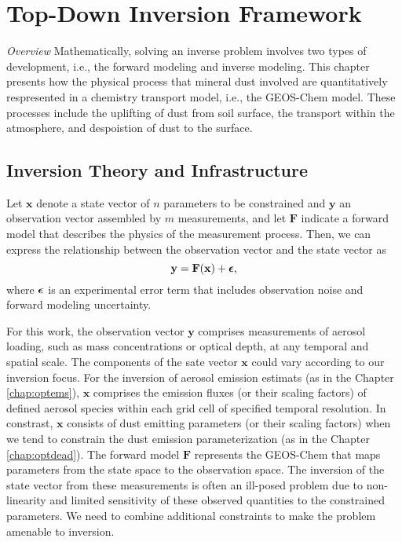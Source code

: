 \chapter{Top-Down Inversion Framework}

 \textit{Overview} \hspace{0.2cm}
 Mathematically, solving an inverse problem involves two types of development, 
 i.e., the forward modeling and inverse modeling. This chapter presents 
 how the physical process that mineral dust
 involved are quantitatively respresented in a chemistry transport model, i.e.,
 the GEOS-Chem model. These processes include the uplifting of dust from soil surface,
 the transport within the atmosphere, and despoistion of dust to the surface.

\section{Inversion Theory and Infrastructure}

Let $\mathbf{x}$ denote a state vector of $n$ parameters to be constrained
 and $\mathbf{y}$ an observation vector assembled by $m$ measurements,
 and let $\mathbf{F}$ indicate a forward model that describes the physics of
 the measurement process. Then, we can express the relationship between
 the observation vector and the state vector as
 \begin{equation} \label{eq:fx}
 \mathbf{y} = \mathbf{F}(\mathbf{x}) + \boldsymbol{\epsilon} \mbox{,}
 \end{equation}
 where $\boldsymbol{\epsilon}$ is an experimental error term that includes
 observation noise and forward modeling uncertainty.

 For this work, the observation
 vector $\mathbf{y}$ comprises measurements of
 aerosol loading, such as mass concentrations or optical depth, at any temporal
 and spatial scale. The components of the sate vector $\mathbf{x}$ could vary
 according to our inversion focus. For the inversion of aerosol emission estimats
 (as in the Chapter \ref{chap:optems}),
 $\mathbf{x}$ comprises the emission fluxes (or their scaling factors) of defined
 aerosol species within each grid cell of specified temporal resolution.
 In constrast, $\mathbf{x}$ consists of
 dust emitting parameters (or their scaling factors) when we tend to constrain
 the dust emission parameterization (as in the Chapter \ref{chap:optdead}).
 The forward model $\mathbf{F}$
 represents the GEOS-Chem that maps parameters from the state space to the
 observation space. The inversion of the state vector from these measurements is often
 an ill-posed problem due to non-linearity and limited sensitivity of these observed
 quantities to the constrained parameters. We need to combine additional constraints
 to make the problem amenable to inversion.

